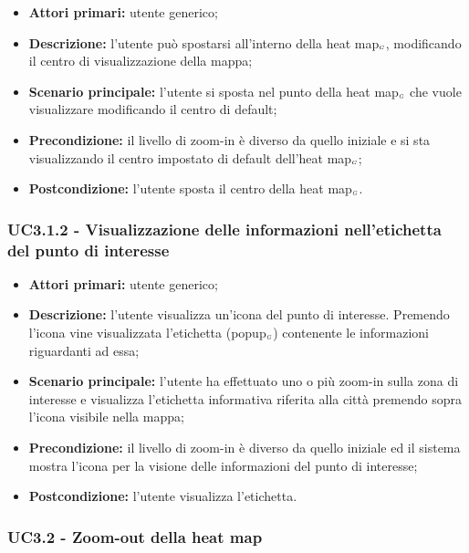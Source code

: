 \begin{itemize}
	\item \textbf{Attori primari:} utente generico;
	\item \textbf{Descrizione:} l’utente può spostarsi all’interno della heat map$_{\scaleto{G}{3pt}}$, modificando il centro di visualizzazione della mappa;
	\item \textbf{Scenario principale:} l’utente si sposta nel punto della heat map$_{\scaleto{G}{3pt}}$ che vuole visualizzare modificando il centro di default;
	\item \textbf{Precondizione:} il livello di zoom-in è diverso da quello iniziale e si sta visualizzando il centro impostato di default dell'heat map$_{\scaleto{G}{3pt}}$;
	\item \textbf{Postcondizione:} l’utente sposta il centro della heat map$_{\scaleto{G}{3pt}}$.
\end{itemize}

\subsubsection{UC3.1.2 - Visualizzazione delle informazioni nell'etichetta del punto di interesse}\label{CasiDUsoCasiDUsoTraUnUtenteEIlFrontEndElencoCasiDUsoUC312VisualizzazioneDelPopupDiUnPuntoDiInteresse}

\begin{itemize}
	\item \textbf{Attori primari:} utente generico;
	\item \textbf{Descrizione:} l’utente visualizza un'icona del punto di interesse. Premendo l'icona vine visualizzata l'etichetta (popup$_{\scaleto{G}{3pt}}$) contenente le informazioni riguardanti ad essa;
	\item \textbf{Scenario principale:} l’utente ha effettuato uno o più zoom-in sulla zona di interesse e visualizza l'etichetta informativa riferita alla città premendo sopra l'icona visibile nella mappa;
	\item \textbf{Precondizione:} il livello di zoom-in è diverso da quello iniziale ed il sistema mostra l'icona per la visione delle informazioni del punto di interesse;
	\item \textbf{Postcondizione:} l’utente visualizza l'etichetta.
\end{itemize}

\subsubsection{UC3.2 - Zoom-out della heat map}\label{CasiDUsoCasiDUsoTraUnUtenteEIlFrontEndElencoCasiDUsoUC32ZoomOutDellaHeatMap}

